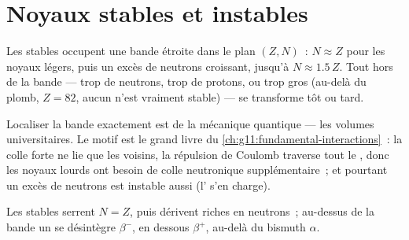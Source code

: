 \section{Noyaux stables et instables}

\begin{proposition}\label{prop:g11:nucleus-radioactivity:valley}
Les  stables occupent une
bande étroite dans le plan $(Z, N)$~: $N \approx Z$ pour les noyaux
légers, puis un excès de neutrons croissant, jusqu'à
$N \approx 1.5\,Z$. Tout 
hors de la bande --- trop de neutrons, trop de protons, ou trop gros
(au-delà du plomb, $Z = 82$, aucun
 n'est vraiment stable) --- se
transforme tôt ou tard.
\end{proposition}
\admitted

\begin{remark}
Localiser la bande exactement est de la mécanique quantique --- les
volumes universitaires. Le motif est le grand livre du
\cref{ch:g11:fundamental-interactions}~: la colle forte ne lie que les
voisins, la répulsion de Coulomb traverse tout le
, donc les noyaux lourds
ont besoin de colle neutronique supplémentaire~; et pourtant un excès de
neutrons est instable aussi (l'
 s'en charge).
\end{remark}

\begin{omfigure}

{\small Les  stables
serrent $N = Z$, puis dérivent riches en neutrons~; au-dessus de la
bande un  se désintègre
$\beta^-$, en dessous $\beta^+$, au-delà du bismuth $\alpha$.}
\end{omfigure}

